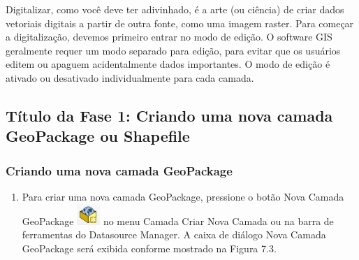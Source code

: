 \documentclass[
]{book}
\providecommand{\tightlist}{%
  \setlength{\itemsep}{0pt}\setlength{\parskip}{0pt}}
\begin{document}
Digitalizar, como você deve ter adivinhado, é a arte (ou ciência) de criar dados vetoriais digitais a partir de outra fonte, como uma imagem raster. Para começar a digitalização, devemos primeiro entrar no modo de edição. O software GIS geralmente requer um modo separado para edição, para evitar que os usuários editem ou apaguem acidentalmente dados importantes. O modo de edição é ativado ou desativado individualmente para cada camada.

\hypertarget{tuxedtulo-da-fase-1-criando-uma-nova-camada-geopackage-ou-shapefile}{%
\subsection{Título da Fase 1: Criando uma nova camada GeoPackage ou Shapefile}\label{tuxedtulo-da-fase-1-criando-uma-nova-camada-geopackage-ou-shapefile}}

\hypertarget{criando-uma-nova-camada-geopackage}{%
\subsubsection{\texorpdfstring{\textbf{Criando uma nova camada GeoPackage}}{Criando uma nova camada GeoPackage}}\label{criando-uma-nova-camada-geopackage}}

\begin{enumerate}
\def\labelenumi{\arabic{enumi}.}
\tightlist
\item
  Para criar uma nova camada GeoPackage, pressione o botão Nova Camada GeoPackage \includegraphics{media/modulo7/geopackage-button.png}
  no menu Camada Criar Nova Camada ou na barra de ferramentas do Datasource Manager. A caixa de diálogo Nova Camada GeoPackage será exibida conforme mostrado na Figura 7.3.
\end{enumerate}
\end{document}
